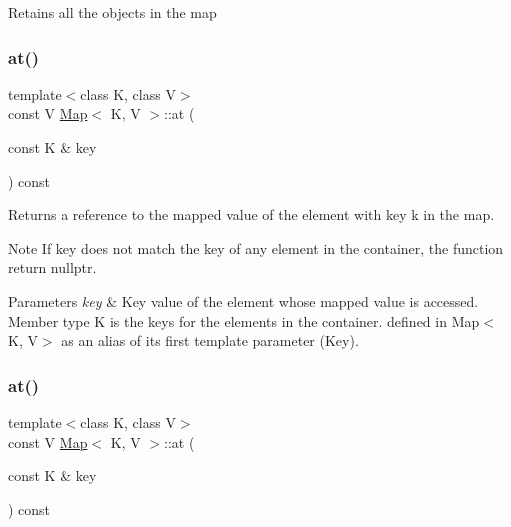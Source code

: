 Retains all the objects in the map \mbox{\label{classMap_aeeeb444bb5ab7cbb672d45c59b31086a}} 
\subsubsection{\texorpdfstring{at()}{at()}\hspace{0.1cm}{\footnotesize\ttfamily [1/2]}}
{\footnotesize\ttfamily template$<$class K, class V$>$ \\
const V \hyperlink{classMap}{Map}$<$ K, V $>$\+::at (\begin{DoxyParamCaption}\item[{const K \&}]{key }\end{DoxyParamCaption}) const\hspace{0.3cm}{\ttfamily [inline]}}

Returns a reference to the mapped value of the element with key k in the map.

\begin{DoxyNote}{Note}
If key does not match the key of any element in the container, the function return nullptr. 
\end{DoxyNote}

\begin{DoxyParams}{Parameters}
{\em key} & Key value of the element whose mapped value is accessed. Member type K is the keys for the elements in the container. defined in Map$<$\+K, V$>$ as an alias of its first template parameter (Key). \\
\hline
\end{DoxyParams}
\mbox{\label{classMap_aeeeb444bb5ab7cbb672d45c59b31086a}} 
\subsubsection{\texorpdfstring{at()}{at()}\hspace{0.1cm}{\footnotesize\ttfamily [2/2]}}
{\footnotesize\ttfamily template$<$class K, class V$>$ \\
const V \hyperlink{classMap}{Map}$<$ K, V $>$\+::at (\begin{DoxyParamCaption}\item[{const K \&}]{key }\end{DoxyParamCaption}) const\hspace{0.3cm}{\ttfamily [inline]}}

